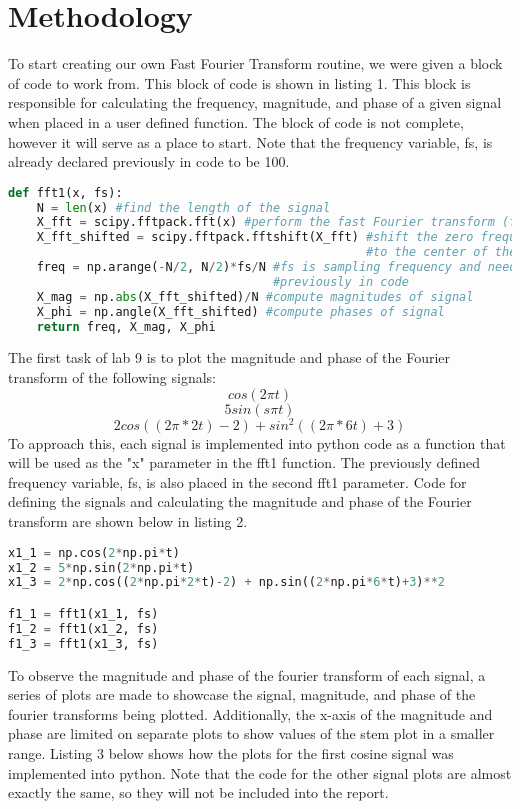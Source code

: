 \documentclass[12pt]{report}
\begin{document}
\section{Methodology}
\hspace{\parindent}To start creating our own Fast Fourier Transform routine, we were given a block of code to work from. This block of code is shown in listing 1. This block is responsible for calculating the frequency, magnitude, and phase of a given signal when placed in a user defined function. The block of code is not complete, however it will serve as a place to start. Note that the frequency variable, fs, is already declared previously in code to be 100. \par
\begin{lstlisting}[language=Python, caption=First FFT Function Code]
def fft1(x, fs):
    N = len(x) #find the length of the signal
    X_fft = scipy.fftpack.fft(x) #perform the fast Fourier transform (fft)
    X_fft_shifted = scipy.fftpack.fftshift(X_fft) #shift the zero frequency components
                                                  #to the center of the spectrum
    freq = np.arange(-N/2, N/2)*fs/N #fs is sampling frequency and needs to be defined
                                     #previously in code
    X_mag = np.abs(X_fft_shifted)/N #compute magnitudes of signal
    X_phi = np.angle(X_fft_shifted) #compute phases of signal
    return freq, X_mag, X_phi
\end{lstlisting}
\hspace{\parindent}The first task of lab 9 is to plot the magnitude and phase of the Fourier transform of the following signals:
\[cos(2\pi t)\]
\[5sin(s\pi t)\]
\[2cos((2\pi * 2t)-2) + sin^2((2\pi *6t)+3)\]
To approach this, each signal is implemented into python code as a function that will be used as the "x" parameter in the fft1 function. The previously defined frequency variable, fs, is also placed in the second fft1 parameter. Code for defining the signals and calculating the magnitude and phase of the Fourier transform are shown below in listing 2. \par
\begin{lstlisting}[language=Python, caption=First Signal Code]
x1_1 = np.cos(2*np.pi*t)
x1_2 = 5*np.sin(2*np.pi*t)
x1_3 = 2*np.cos((2*np.pi*2*t)-2) + np.sin((2*np.pi*6*t)+3)**2

f1_1 = fft1(x1_1, fs)
f1_2 = fft1(x1_2, fs)
f1_3 = fft1(x1_3, fs)
\end{lstlisting}
\hspace{\parindent}To observe the magnitude and phase of the fourier transform of each signal, a series of plots are made to showcase the signal, magnitude, and phase of the fourier transforms being plotted. Additionally, the x-axis of the magnitude and phase are limited on separate plots to show values of the stem plot in a smaller range. Listing 3 below shows how the plots for the first cosine signal was implemented into python. Note that the code for the other signal plots are almost exactly the same, so they will not be included into the report. \par
\end{document}
